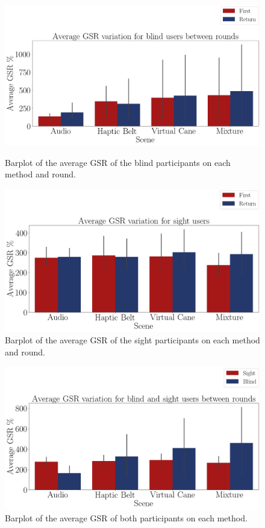 \begin{figure}[!htb]
    \centering
    \begin{minipage}{\textwidth}
        \centering
        \includegraphics[width = 0.8\linewidth]{Resultados/GSR/Figuras/png/barplot_gsr_avg_4_scene_blind.png}
        \caption{Barplot of the average GSR of the blind participants on each method and round.}
        \label{fig:barplot_gsr_avg_4_scene_blind}
    \end{minipage}
    \begin{minipage}{\textwidth}
        \centering
        \includegraphics[width = 0.8\linewidth]{Resultados/GSR/Figuras/png/barplot_gsr_avg_4_scene_sight.png}
        \caption{Barplot of the average GSR of the sight participants on each method and round.}
        \label{fig:barplot_gsr_avg_4_scene_sight}
    \end{minipage}
\end{figure}
\begin{figure}[!htb]
    \centering
    \includegraphics[width = 0.8\linewidth]{Resultados/GSR/Figuras/png/barplot_gsr_avg_4_scene.png}
    \caption{Barplot of the average GSR of both participants on each method.}
    \label{fig:barplot_gsr_avg_4_scene}
\end{figure}

